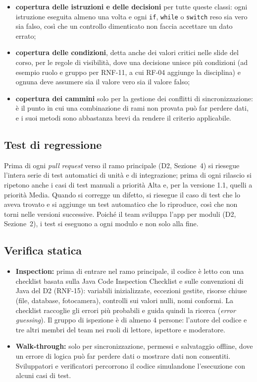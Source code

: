 \begin{itemize}
    \item \textbf{copertura delle istruzioni e delle decisioni} per tutte queste classi: ogni istruzione eseguita almeno una volta e ogni \texttt{if}, \texttt{while} o \texttt{switch} reso sia vero sia falso, così che un controllo dimenticato non faccia accettare un dato errato;
    \item \textbf{copertura delle condizioni}, detta anche dei valori critici nelle slide del corso, per le regole di visibilità, dove una decisione unisce più condizioni (ad esempio ruolo e gruppo per RNF-11, a cui RF-04 aggiunge la disciplina) e ognuna deve assumere sia il valore vero sia il valore falso;
    \item \textbf{copertura dei cammini} solo per la gestione dei conflitti di sincronizzazione: è il punto in cui una combinazione di rami non provata può far perdere dati, e i suoi metodi sono abbastanza brevi da rendere il criterio applicabile.
\end{itemize}

\subsection{Test di regressione}

Prima di ogni \emph{pull request} verso il ramo principale (D2, Sezione~4) si riesegue l'intera serie di test automatici di unità e di integrazione; prima di ogni rilascio si ripetono anche i casi di test manuali a priorità Alta e, per la versione 1.1, quelli a priorità Media. Quando si corregge un difetto, si riesegue il caso di test che lo aveva trovato e si aggiunge un test automatico che lo riproduce, così che non torni nelle versioni successive. Poiché il team sviluppa l'app per moduli (D2, Sezione~2), i test si eseguono a ogni modulo e non solo alla fine.

\subsection{Verifica statica}

\begin{itemize}
    \item \textbf{Inspection:} prima di entrare nel ramo principale, il codice è letto con una checklist basata sulla Java Code Inspection Checklist e sulle convenzioni di Java del D2 (RNF-15): variabili inizializzate, eccezioni gestite, risorse chiuse (file, database, fotocamera), controlli sui valori nulli, nomi conformi. La checklist raccoglie gli errori più probabili e guida quindi la ricerca (\emph{error guessing}). Il gruppo di ispezione è di almeno 4 persone: l'autore del codice e tre altri membri del team nei ruoli di lettore, ispettore e moderatore.
    \item \textbf{Walk-through:} solo per sincronizzazione, permessi e salvataggio offline, dove un errore di logica può far perdere dati o mostrare dati non consentiti. Sviluppatori e verificatori percorrono il codice simulandone l'esecuzione con alcuni casi di test.
\end{itemize}

